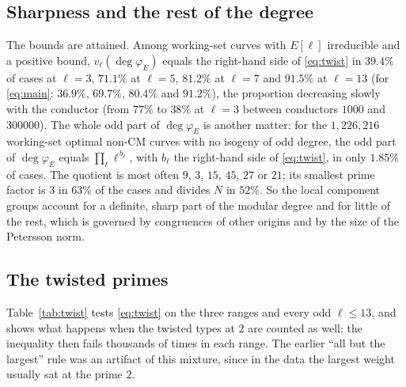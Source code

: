 \documentclass[11pt]{amsart}
\theoremstyle{definition}
\newcommand{\degphi}{\deg\varphi_E}
\begin{document}
\subsection{Sharpness and the rest of the degree}\label{sec:sharp}
The bounds are attained. Among working-set curves with $E[\ell]$ irreducible and a positive bound, $v_\ell(\degphi)$ equals the right-hand side of \eqref{eq:twist} in $39.4\%$ of cases at $\ell=3$, $71.1\%$ at $\ell=5$, $81.2\%$ at $\ell=7$ and $91.5\%$ at $\ell=13$ (for \eqref{eq:main}: $36.9\%$, $69.7\%$, $80.4\%$ and $91.2\%$), the proportion decreasing slowly with the conductor (from $77\%$ to $38\%$ at $\ell=3$ between conductors $1000$ and $300000$). The whole odd part of $\degphi$ is another matter: for the $1{,}226{,}216$ working-set optimal non-CM curves with no isogeny of odd degree, the odd part of $\degphi$ equals $\prod_\ell\ell^{\,b_\ell}$, with $b_\ell$ the right-hand side of \eqref{eq:twist}, in only $1.85\%$ of cases. The quotient is most often $9$, $3$, $15$, $45$, $27$ or $21$; its smallest prime factor is $3$ in $63\%$ of the cases and divides $N$ in $52\%$. So the local component groups account for a definite, sharp part of the modular degree and for little of the rest, which is governed by congruences of other origins and by the size of the Petersson norm.

\subsection{The twisted primes}\label{sec:twisted}
Table~\ref{tab:twist} tests \eqref{eq:twist} on the three ranges and every odd $\ell\le13$, and shows what happens when the twisted types at $2$ are counted as well: the inequality then fails thousands of times in each range. The earlier ``all but the largest'' rule was an artifact of this mixture, since in the data the largest weight usually sat at the prime $2$.

\begin{table}[ht]
\centering\footnotesize

\caption{The twisted primes. ``Odd twisted weight $>0$'': curves with $E[\ell]$ irreducible, not CM, having an odd prime of type $\mathrm{II}$, $\mathrm{II}^*$ ($\ell=3$) or $\mathrm{I}_n^*$ with $\ell\mid n$. ``Twisted prime 2'': curves where the prime $2$ is of such a type. The last column counts the violations of \eqref{eq:twist} with the weight of the prime $2$ added to the right-hand side.}\label{tab:twist}
\end{table}
\end{document}
